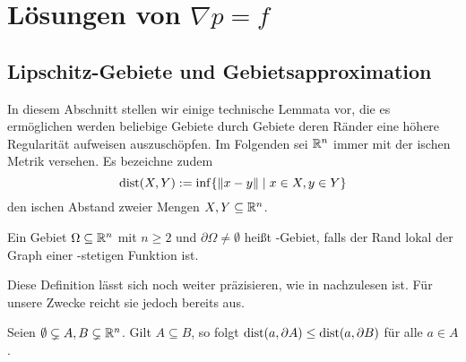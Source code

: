 \chapter{Lösungen von $\nabla p = f$}
\section{Lipschitz-Gebiete und Gebietsapproximation}

In diesem Abschnitt stellen wir einige technische Lemmata vor, die es ermöglichen werden beliebige Gebiete durch Gebiete deren Ränder eine höhere Regularität aufweisen auszuschöpfen.
Im Folgenden sei $\mathbb{R}^n$ immer mit der \euklid ischen Metrik versehen. Es bezeichne zudem
$$
\operatorname{dist}(X,Y) := \inf\{ \lVert x - y \rVert \mid x \in X, y \in Y\}
$$
den \euklid ischen Abstand zweier Mengen $X,Y \subseteq \mathbb{R}^n$.

\begin{defn}
  Ein Gebiet $\Omega \subseteq \mathbb{R}^n$ mit $n \geq 2$ und $\partial \Omega \neq \emptyset$ heißt \lipschitz\hyp{}Gebiet, falls der Rand lokal der Graph einer \lipschitz\hyp{}stetigen Funktion ist.
\end{defn}

Diese Definition lässt sich noch weiter präzisieren, wie in \cite[S.25, 3.2]{sohr2001navier} nachzulesen ist. Für unsere Zwecke reicht sie jedoch bereits aus.

\begin{lem}
  \label{lem:distBoundary}
  Seien $\emptyset \subsetneq A,B \subsetneq \mathbb{R}^n$. Gilt $A \subseteq B$, so folgt $\operatorname{dist}(a,\partial A) \leq \operatorname{dist}(a, \partial B)$ für alle $a \in A$.
\end{lem}

